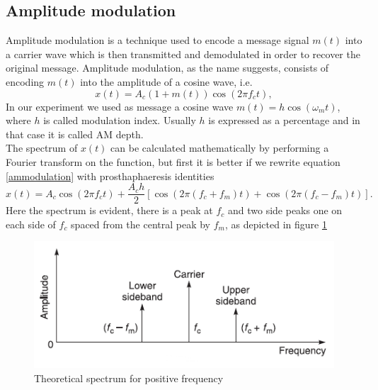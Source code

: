 \documentclass[a4paper,10pt]{article}
\begin{document}
\subsection{Amplitude modulation}
Amplitude modulation is a technique used to encode a message signal $m(t)$ into a carrier wave which is then transmitted and demodulated in order to recover the original message. Amplitude modulation, as the name suggests, consists of encoding $m(t)$ into the amplitude of a cosine wave, i.e.
\begin{equation}\label{ammodulation}x(t) = A_c (1+ m(t))\cos(2\pi f_c t),\end{equation}
In our experiment we used as message a cosine wave $m(t) = h\cos(\omega_m t)$, where $h$ is called modulation index. Usually $h$ is expressed as a percentage and in that case it is called AM depth.\\
The spectrum of $x(t)$ can be calculated mathematically by performing a Fourier transform on the function, but first it is better if we rewrite equation \eqref{ammodulation} with prosthaphaeresis identities
\[x(t) = A_c \cos(2\pi f_c t) + \frac{A_ch}{2}\left[\cos(2\pi(f_c + f_m)t)+\cos(2\pi(f_c - f_m)t)\right].\]
Here the spectrum is evident, there is a peak at $f_c$ and two side peaks one on each side of $f_c$ spaced from the central peak by $f_m$, as depicted in figure \ref{amtheory}
\begin{figure}[H]
\centering
\includegraphics[width=.7\textwidth]{amtheory}
\caption{Theoretical spectrum for positive frequency}\label{amtheory}
\end{figure}
\end{document}
